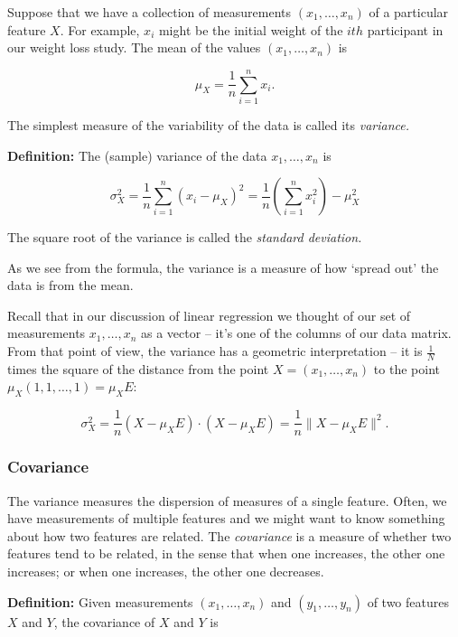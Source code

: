 \documentclass[
]{article}
\begin{document}
Suppose that we have a collection of measurements \((x_1,\ldots, x_n)\)
of a particular feature \(X\). For example, \(x_i\) might be the initial
weight of the \(ith\) participant in our weight loss study. The mean of
the values \((x_1,\ldots, x_n)\) is

\[
\mu_{X} = \frac{1}{n}\sum_{i=1}^{n} x_{i}.
\]

The simplest measure of the variability of the data is called its
\emph{variance.}

\textbf{Definition:} The (sample) variance of the data
\(x_1,\ldots, x_n\) is

\begin{equation}
\sigma_{X}^2 = \frac{1}{n}\sum_{i=1}^{n} \left(x_{i}-\mu_{X}\right)^2 = \frac{1}{n}\left(\sum_{i=1}^{n} x_{i}^2\right)- \mu_{X}^2
\label{eq:variance}\end{equation}

The square root of the variance is called the \emph{standard deviation.}

As we see from the formula, the variance is a measure of how `spread
out' the data is from the mean.

Recall that in our discussion of linear regression we thought of our set
of measurements \(x_1,\ldots, x_n\) as a vector -- it's one of the
columns of our data matrix. From that point of view, the variance has a
geometric interpretation -- it is \(\frac{1}{N}\) times the square of
the distance from the point \(X=(x_1,\ldots, x_n)\) to the point
\(\mu_{X}(1,1,\ldots,1)=\mu_{X}E\):

\begin{equation}
\sigma_{X}^2 = \frac{1}{n}(X-\mu_{X}E)\cdot(X-\mu_{X}E)  = \frac{1}{n}\|X-\mu_{X}E\|^2.
\label{eq:variancedot}\end{equation}

\hypertarget{covariance}{%
\subsubsection{Covariance}\label{covariance}}

The variance measures the dispersion of measures of a single feature.
Often, we have measurements of multiple features and we might want to
know something about how two features are related. The \emph{covariance}
is a measure of whether two features tend to be related, in the sense
that when one increases, the other one increases; or when one increases,
the other one decreases.

\textbf{Definition:} Given measurements \((x_1,\ldots, x_n)\) and
\((y_1,\ldots, y_n)\) of two features \(X\) and \(Y\), the covariance of
\(X\) and \(Y\) is
\end{document}
